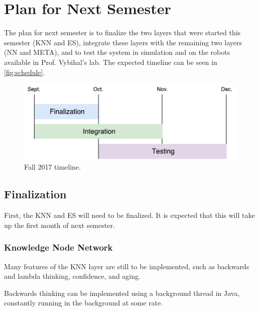 \documentclass[titlepage,11pt]{article}
\begin{document}
\section{Plan for Next Semester}
\label{sec:plan}

The plan for next semester is to finalize the two layers that were started this semester (KNN and ES), integrate these layers with the remaining two layers (NN and META), and to test the system in simulation and on the robots available in Prof. Vybihal's lab. The expected timeline can be seen in \autoref{fig:schedule}.

\begin{figure}[!htb]
	\includegraphics[width=\columnwidth]{figures/schedule.pdf}
	\caption
	{Fall 2017 timeline.}
	\label{fig:schedule}
\end{figure}

\subsection{Finalization}

First, the KNN and ES will need to be finalized. It is expected that this will take up the first month of next semester.

\subsubsection{Knowledge Node Network}

Many features of the KNN layer are still to be implemented, such as backwards and lambda thinking, confidence, and aging.

Backwards thinking can be implemented using a background thread in Java, constantly running in the background at some rate.
\end{document}
